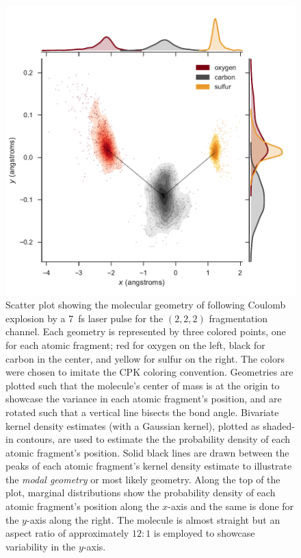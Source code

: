 \begin{figure}
  \centering
  \includegraphics[width=\textwidth]{Plots/OCS2227fsLTGeometry}
  \caption[Scatter plot showing the molecular geometry of  following Coulomb explosion by a \SI{7}{\fs} laser pulse for the $(2,2,2)$ fragmentation channel.]
  {Scatter plot showing the molecular geometry of  following Coulomb explosion by a \SI{7}{\fs} laser pulse for the $(2,2,2)$ fragmentation channel. Each geometry is represented by three colored points, one for each atomic fragment; red for oxygen on the left, black for carbon in the center, and yellow for sulfur on the right. The colors were chosen to imitate the CPK coloring convention. Geometries are plotted such that the molecule's center of mass is at the origin to showcase the variance in each atomic fragment's position, and are rotated such that a vertical line bisects the  bond angle. Bivariate kernel density estimates (with a Gaussian kernel), plotted as shaded-in contours, are used to estimate the the probability density of each atomic fragment's position. Solid black lines are drawn between the peaks of each atomic fragment's kernel density estimate to illustrate the \emph{modal geometry} or most likely geometry. Along the top of the plot, marginal distributions show the probability density of each atomic fragment's position along the $x$-axis and the same is done for the $y$-axis along the right. The molecule is almost straight but an aspect ratio of approximately $12:1$ is employed to showcase variability in the $y$-axis.}
  \label{fig:OCS2227fsLTGeometry}
\end{figure}

